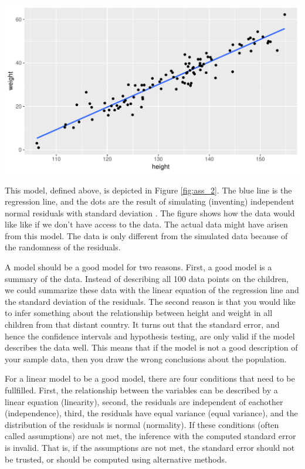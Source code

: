 \documentclass[]{report}\usepackage[]{graphicx}\usepackage[]{color}
\makeatletter
\def\maxwidth{ %
  \ifdim\Gin@nat@width>\linewidth
    \linewidth
  \else
    \Gin@nat@width
  \fi
}
\newenvironment{knitrout}{}{} %
\makeatother
\begin{document}
\begin{knitrout}
\color{fgcolor}

{\centering \includegraphics[width=\maxwidth]{figure/ass_2-1} 

}



\end{knitrout}


This model, defined above, is depicted in Figure \ref{fig:ass_2}. The blue line is the regression line, and the dots are the result of simulating (inventing) independent normal residuals with standard deviation . The figure shows how the data would like like if we don't have access to the data. 
The actual data might have arisen from this model. The data is only different from the simulated data because of the randomness of the residuals. 

A model should be a good model for two reasons. First, a good model is a summary of the data. Instead of describing all 100 data points on the children, we could summarize these data with the linear equation of the regression line and the standard deviation of the residuals. The second reason is that you would like to infer something about the relationship between height and weight in all children from that distant country. It turns out that the standard error, and hence the confidence intervals  and hypothesis testing, are only valid if the model describes the data well. This means that if the model is not a good description of your sample data, then you draw the wrong conclusions about the population.

For a linear model to be a good model, there are four conditions that need to be fullfilled. First, the relationship between the variables can be described by a linear equation (linearity), second, the residuals are independent of eachother (independence), third, the residuals have equal variance (equal variance), and the distribution of the residuals is normal (normality). If these conditions (often called assumptions) are not met, the inference with the computed standard error is invalid. That is, if the assumptions are not met, the standard error should not be trusted, or should be computed using alternative methods. 
\end{document}
